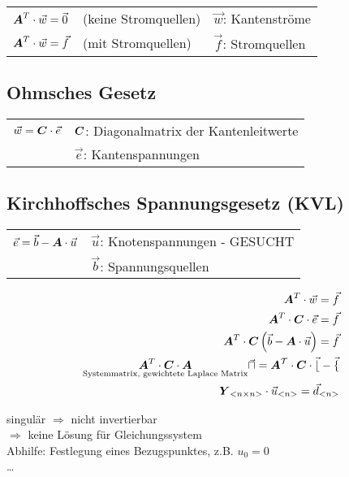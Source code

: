 \begin{tabular}{lll}
	$\boldsymbol {A}^T\cdot \vec{w} = \vec{0}$ & (keine Stromquellen) & $\vec{w}$: Kantenströme\\
	$\boldsymbol {A}^T\cdot \vec{w} = \vec{f}$ & (mit Stromquellen) & $\vec{f}$: Stromquellen
\end{tabular}

\subsection{Ohmsches Gesetz}
\begin{tabular}{ll}
	$\vec{w} = \boldsymbol {C} \cdot \vec{e}$ & $\boldsymbol {C}$: Diagonalmatrix der Kantenleitwerte\\
	 & $\vec{e}$: Kantenspannungen
\end{tabular}

\subsection{Kirchhoffsches Spannungsgesetz (KVL)}
\begin{tabular}{ll}
	$\vec{e} = \vec{b} - \boldsymbol {A} \cdot \vec{u}$ & $\vec{u}$: Knotenspannungen - GESUCHT\\
	 & $\vec{b}$: Spannungsquellen
\end{tabular}

\begin{align}
	\boldsymbol {A}^T \cdot \vec{w} = \vec{f}\\
	\boldsymbol {A}^T \cdot \boldsymbol {C} \cdot \vec{e} = \vec{f}\\
	\boldsymbol {A}^T \cdot \boldsymbol {C} \left( \vec{b} - \boldsymbol {A}\cdot\vec{u}\right) = \vec{f}\\
	\underset{\text{Systemmatrix, gewichtete Laplace Matrix}}{\boldsymbol {A}^T \cdot \boldsymbol {C} \cdot \boldsymbol {A}} \cal \vec{u} = \boldsymbol {A}^T \cdot \boldsymbol {C} \cdot \vec{b} - \vec{f}\\
	\boldsymbol {Y}_{<n\times n>} \cdot \vec{u}_{<n>} = \vec{d}_{<n>}
\end{align}

singulär $\Rightarrow$ nicht invertierbar\\
$\Rightarrow$ keine Lösung für Gleichungssystem\\
Abhilfe: Festlegung eines Bezugspunktes, z.B. $u_0 = 0$\\
\ldots

